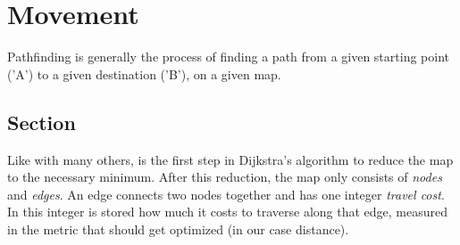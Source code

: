 \chapter{Movement}\label{ch:move}
Pathfinding is generally the process of finding a path from a given starting point ('A')
to a given destination ('B'),
on a given map.

\section{Section}\label{sec:sec}
Like with many others,
is the first step in Dijkstra's algorithm to reduce the map to the necessary minimum.
After this reduction, the map only consists of \emph{nodes} and \emph{edges}.
An edge connects two nodes together and has one integer \emph{travel cost}.
In this integer is stored how much it costs to traverse along that edge,
measured in the metric that should get optimized (in our case distance).
